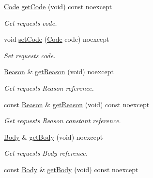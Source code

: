 \begin{DoxyCompactItemize}
\mbox{\hyperlink{namespaceo_z_1_1_h_t_t_p_acd43703151305f79b1e2f42e98ee8199}{Code}} \mbox{\hyperlink{classo_z_1_1_h_t_t_p_1_1_response_aa2191a167fe53e8f0a8c2e64393cede0}{get\+Code}} (void) const noexcept
\begin{DoxyCompactList}\small\item\em Get request\textquotesingle{}s code. \end{DoxyCompactList}\item 
void \mbox{\hyperlink{classo_z_1_1_h_t_t_p_1_1_response_a87d7f7da3ff4de61d1ead1a7d336dfa8}{set\+Code}} (\mbox{\hyperlink{namespaceo_z_1_1_h_t_t_p_acd43703151305f79b1e2f42e98ee8199}{Code}} code) noexcept
\begin{DoxyCompactList}\small\item\em Set request\textquotesingle{}s code. \end{DoxyCompactList}\item 
\mbox{\hyperlink{namespaceo_z_1_1_h_t_t_p_afcd8b91e5e8a7b6df0a7b3b298ec3965}{Reason}} \& \mbox{\hyperlink{classo_z_1_1_h_t_t_p_1_1_response_a72ccc6e4aa64f1bf2c54218436631a26}{get\+Reason}} (void) noexcept
\begin{DoxyCompactList}\small\item\em Get request\textquotesingle{}s Reason reference. \end{DoxyCompactList}\item 
const \mbox{\hyperlink{namespaceo_z_1_1_h_t_t_p_afcd8b91e5e8a7b6df0a7b3b298ec3965}{Reason}} \& \mbox{\hyperlink{classo_z_1_1_h_t_t_p_1_1_response_a9b05303e7b76a04d3ab4ed8960de130c}{get\+Reason}} (void) const noexcept
\begin{DoxyCompactList}\small\item\em Get request\textquotesingle{}s Reason constant reference. \end{DoxyCompactList}\item 
\mbox{\hyperlink{namespaceo_z_1_1_h_t_t_p_a270c38b9f9b6228ce430fda6d5b150d6}{Body}} \& \mbox{\hyperlink{classo_z_1_1_h_t_t_p_1_1_response_a7f32dbfaac05fb9eea48e33933156e55}{get\+Body}} (void) noexcept
\begin{DoxyCompactList}\small\item\em Get request\textquotesingle{}s Body reference. \end{DoxyCompactList}\item 
const \mbox{\hyperlink{namespaceo_z_1_1_h_t_t_p_a270c38b9f9b6228ce430fda6d5b150d6}{Body}} \& \mbox{\hyperlink{classo_z_1_1_h_t_t_p_1_1_response_a5cae2054ce103c55d54c41da4f1e8962}{get\+Body}} (void) const noexcept

\end{DoxyCompactItemize}
